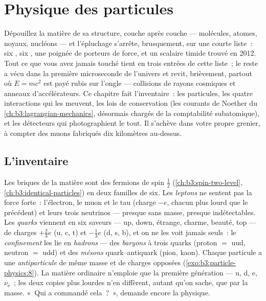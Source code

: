 \chapter{Physique des particules}\label{ch:b3:particle-physics}


Dépouillez la matière de sa structure, couche après couche ---
molécules, atomes, noyaux, nucléons --- et l'épluchage s'arrête,
brusquement, sur une courte liste~: six \emph{}, six
\emph{}, une poignée de porteurs de force, et un scalaire
timide trouvé en 2012. Tout ce que vous avez jamais touché tient en
trois entrées de cette liste~; le reste a vécu dans la première
microseconde de l'univers et revit, brièvement, partout où
$E = mc^2$ est payé rubis sur l'ongle --- collisions de rayons
cosmiques et anneaux d'accélérateurs. Ce chapitre fait l'inventaire~:
les particules, les quatre interactions qui les meuvent, les lois de
conservation (les courants de Noether du
\cref{ch:b3:lagrangian-mechanics}, désormais chargés de la
comptabilité subatomique), et les détecteurs qui photographient le
tout. Il s'achève dans votre propre grenier, à compter des muons
fabriqués dix kilomètres au-dessus.

\section{L'inventaire}

\begin{definition}\label{def:b3:particle-physics:zoo}
Les briques de la matière sont des fermions de spin $\tfrac12$
(\cref{ch:b3:spin-two-level}, \cref{ch:b3:identical-particles}) en
deux familles de six. Les \emph{leptons} ne sentent pas la force
forte~: l'électron, le muon et le tau (charge $-e$, chacun plus lourd
que le précédent) et leurs trois neutrinos --- presque sans masse,
presque indétectables. Les \emph{quarks} viennent en six saveurs ---
up, down, étrange, charme, beauté, top --- de charges $+\tfrac23e$
(u, c, t) et $-\tfrac13e$ (d, s, b), et on ne les voit jamais seuls~:
le \emph{confinement} les lie en \emph{hadrons} --- des
\emph{baryons} à trois quarks (proton $=$ uud, neutron $=$ udd) et
des \emph{mésons} quark--antiquark (pion, kaon). Chaque particule a
une \emph{antiparticule} de même masse et de charges opposées
(\cref{exo:b3:particle-physics:8}). La matière ordinaire n'emploie
que la première génération --- u, d, e, $\nu_{\text{e}}$~; les deux
copies plus lourdes n'en diffèrent, autant qu'on sache, que par la
masse. «~Qui a commandé cela~?~», demande encore la physique.
\end{definition}

